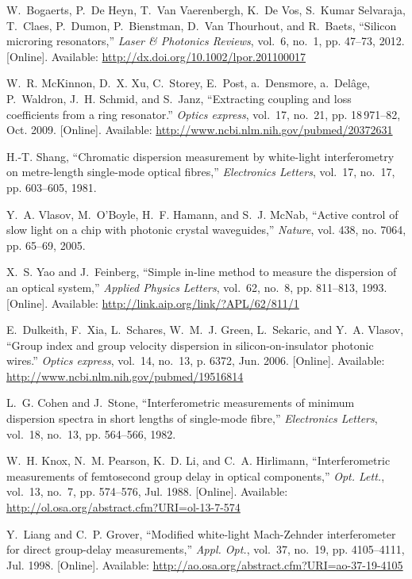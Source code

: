 \documentclass[journal]{IEEEtran}
\begin{document}
\begin{thebibliography}{10}
\BIBentryALTinterwordspacing
W.~Bogaerts, P.~{De Heyn}, T.~{Van Vaerenbergh}, K.~{De Vos}, S.~{Kumar
  Selvaraja}, T.~Claes, P.~Dumon, P.~Bienstman, D.~{Van Thourhout}, and
  R.~Baets, ``{Silicon microring resonators},'' \emph{Laser \& Photonics
  Reviews}, vol.~6, no.~1, pp. 47--73, 2012. [Online]. Available:
  \url{http://dx.doi.org/10.1002/lpor.201100017}
\BIBentrySTDinterwordspacing

\BIBentryALTinterwordspacing
W.~R. McKinnon, D.~X. Xu, C.~Storey, E.~Post, a.~Densmore, a.~Del\^{a}ge,
  P.~Waldron, J.~H. Schmid, and S.~Janz, ``{Extracting coupling and loss
  coefficients from a ring resonator.}'' \emph{Optics express}, vol.~17,
  no.~21, pp. 18\,971--82, Oct. 2009. [Online]. Available:
  \url{http://www.ncbi.nlm.nih.gov/pubmed/20372631}
\BIBentrySTDinterwordspacing

H.-T. Shang, ``{Chromatic dispersion measurement by white-light interferometry
  on metre-length single-mode optical fibres},'' \emph{Electronics Letters},
  vol.~17, no.~17, pp. 603--605, 1981.

Y.~A. Vlasov, M.~O'Boyle, H.~F. Hamann, and S.~J. McNab, ``{Active control of
  slow light on a chip with photonic crystal waveguides},'' \emph{Nature}, vol.
  438, no. 7064, pp. 65--69, 2005.

\BIBentryALTinterwordspacing
X.~S. Yao and J.~Feinberg, ``{Simple in-line method to measure the dispersion
  of an optical system},'' \emph{Applied Physics Letters}, vol.~62, no.~8, pp.
  811--813, 1993. [Online]. Available:
  \url{http://link.aip.org/link/?APL/62/811/1}
\BIBentrySTDinterwordspacing

\BIBentryALTinterwordspacing
E.~Dulkeith, F.~Xia, L.~Schares, W.~M.~J. Green, L.~Sekaric, and Y.~A. Vlasov,
  ``{Group index and group velocity dispersion in silicon-on-insulator photonic
  wires.}'' \emph{Optics express}, vol.~14, no.~13, p. 6372, Jun. 2006.
  [Online]. Available:
  \url{http://www.ncbi.nlm.nih.gov/pubmed/19516814}
\BIBentrySTDinterwordspacing

L.~G. Cohen and J.~Stone, ``{Interferometric measurements of minimum dispersion
  spectra in short lengths of single-mode fibre},'' \emph{Electronics Letters},
  vol.~18, no.~13, pp. 564--566, 1982.

\BIBentryALTinterwordspacing
W.~H. Knox, N.~M. Pearson, K.~D. Li, and C.~A. Hirlimann, ``{Interferometric
  measurements of femtosecond group delay in optical components},'' \emph{Opt.
  Lett.}, vol.~13, no.~7, pp. 574--576, Jul. 1988. [Online]. Available:
  \url{http://ol.osa.org/abstract.cfm?URI=ol-13-7-574}
\BIBentrySTDinterwordspacing

\BIBentryALTinterwordspacing
Y.~Liang and C.~P. Grover, ``{Modified white-light Mach-Zehnder interferometer
  for direct group-delay measurements},'' \emph{Appl. Opt.}, vol.~37, no.~19,
  pp. 4105--4111, Jul. 1998. [Online]. Available:
  \url{http://ao.osa.org/abstract.cfm?URI=ao-37-19-4105}
\BIBentrySTDinterwordspacing

\end{thebibliography}
\end{document}
